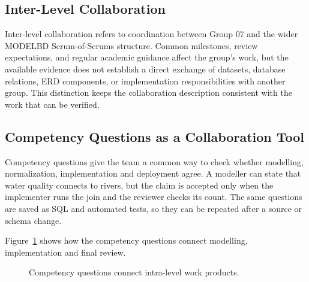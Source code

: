 \subsection{Inter-Level Collaboration}
\label{subsec:inter-level-collaboration}

Inter-level collaboration refers to coordination between Group 07 and the
wider MODELBD Scrum-of-Scrums structure. Common milestones, review
expectations, and regular academic guidance affect the group's work, but the
available evidence does not establish a direct exchange of datasets, database
relations, ERD components, or implementation responsibilities with another
group. This distinction keeps the collaboration description consistent with
the work that can be verified.

\subsection{Competency Questions as a Collaboration Tool}
\label{subsec:competency-collaboration}

Competency questions give the team a common way to check whether modelling,
normalization, implementation and deployment agree. A modeller can state that water
quality connects to rivers, but the claim is accepted only when the implementer
runs the join and the reviewer checks its count. The same questions are saved
as SQL and automated tests, so they can be repeated after a source or schema
change.

Figure~\ref{fig:competency-collaboration} shows how the competency questions
connect modelling, implementation and final review.

\begin{figure}[H]
\centering
{}
\caption{Competency questions connect intra-level work products.}
\label{fig:competency-collaboration}
\end{figure}
